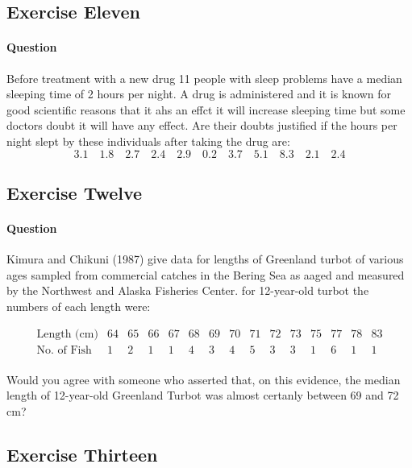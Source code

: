 \documentclass[]{article}
\let\oldparagraph\paragraph
\renewcommand{\paragraph}[1]{\oldparagraph{#1}\mbox{}}
\begin{document}
\subsection{Exercise Eleven}\label{exercise-eleven}

\paragraph{Question}\label{question-10}

Before treatment with a new drug 11 people with sleep problems have a
median sleeping time of 2 hours per night. A drug is administered and it
is known for good scientific reasons that it ahs an effct it will
increase sleeping time but some doctors doubt it will have any effect.
Are their doubts justified if the hours per night slept by these
individuals after taking the drug are: \[
3.1\quad1.8\quad2.7\quad2.4\quad2.9\quad0.2\quad3.7\quad5.1\quad8.3\quad2.1\quad2.4
\]

\subsection{Exercise Twelve}\label{exercise-twelve}

\paragraph{Question}\label{question-11}

Kimura and Chikuni (1987) give data for lengths of Greenland turbot of
various ages sampled from commercial catches in the Bering Sea as aaged
and measured by the Northwest and Alaska Fisheries Center. for
12-year-old turbot the numbers of each length were:

\[\begin{array}
{cccccccccc}
\text{Length (cm)} & 64 & 65 & 66 & 67 & 68 & 69 & 70 & 71 & 72 & 73 & 75 & 77 & 78 & 83 \\
\text{No. of Fish} & 1 & 2 & 1 & 1 & 4 & 3 & 4 & 5 & 3 & 3 & 1 & 6 & 1 & 1 \\
\end{array}
\]

Would you agree with someone who asserted that, on this evidence, the
median length of 12-year-old Greenland Turbot was almost certanly
between 69 and 72 cm?

\subsection{Exercise Thirteen}\label{exercise-thirteen}
\end{document}
